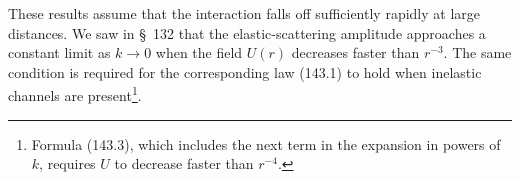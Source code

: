 These results assume that the interaction falls off sufficiently rapidly at large distances. We saw in \S~132 that the elastic-scattering amplitude approaches a constant limit as $k\to0$ when the field $U(r)$ decreases faster than $r^{-3}$. The same condition is required for the corresponding law (143.1) to hold when inelastic channels are present\footnote{Formula (143.3), which includes the next term in the expansion in powers of $k$, requires $U$ to decrease faster than $r^{-4}$.}.
